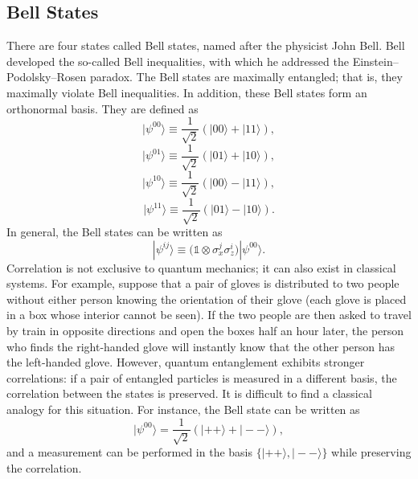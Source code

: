 \documentclass[a4paper]{article}
\begin{document}
\subsection{Bell States}
There are four states called Bell states, named after the physicist John Bell. Bell developed the so-called Bell inequalities\cite{Bell}, with which he addressed the Einstein--Podolsky--Rosen paradox. The Bell states are maximally entangled; that is, they maximally violate Bell inequalities. In addition, these Bell states form an orthonormal basis. They are defined as
\begin{equation}\label{eq::bell1}
|\psi^{00}\rangle\equiv \frac{1}{\sqrt{2}}(|00\rangle+|11\rangle),
\end{equation}
\begin{equation}\label{eq::bell2}
|\psi^{01}\rangle\equiv \frac{1}{\sqrt{2}}(|01\rangle+|10\rangle),
\end{equation}
\begin{equation}\label{eq::bell3}
|\psi^{10}\rangle\equiv \frac{1}{\sqrt{2}}(|00\rangle-|11\rangle),
\end{equation}
\begin{equation}\label{eq::bell4}
|\psi^{11}\rangle\equiv \frac{1}{\sqrt{2}}(|01\rangle-|10\rangle).
\end{equation}
In general, the Bell states can be written as
\begin{equation}
|\psi^{ij}\rangle\equiv \big( \mathbb{1}\otimes\sigma_x^j \sigma_z^i \big)|\psi^{00}\rangle.
\end{equation}
Correlation is not exclusive to quantum mechanics; it can also exist in classical systems. For example, suppose that a pair of gloves is distributed to two people without either person knowing the orientation of their glove (each glove is placed in a box whose interior cannot be seen). If the two people are then asked to travel by train in opposite directions and open the boxes half an hour later, the person who finds the right-handed glove will instantly know that the other person has the left-handed glove. However, quantum entanglement exhibits stronger correlations: if a pair of entangled particles is measured in a different basis, the correlation between the states is preserved. It is difficult to find a classical analogy for this situation. For instance, the Bell state can be written as
\begin{equation}
|\psi^{00}\rangle=\frac{1}{\sqrt{2}}\left(|++\rangle+|--\rangle\right),
\end{equation}
and a measurement can be performed in the basis $\{|++\rangle,|--\rangle\}$ while preserving the correlation.
\end{document}
